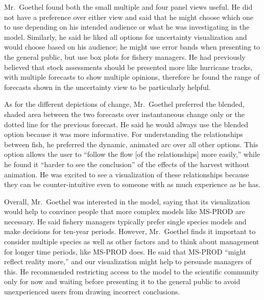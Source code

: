 Mr.\ Goethel found both the small multiple and four panel views useful.  He did not have a preference over either view and said that he might choose which one to use depending on his intended audience or what he was investigating in the model.  Similarly, he said he liked all options for uncertainty visualization and would choose based on his audience; he might use error bands when presenting to the general public, but use box plots for fishery managers.  He had previously believed that stock assessments should be presented more like hurricane tracks, with multiple forecasts to show multiple opinions, therefore he found the range of forecasts shown in the uncertainty view to be particularly helpful.

As for the different depictions of change, Mr.\ Goethel preferred the blended, shaded area between the two forecasts over instantaneous change only or the dotted line for the previous forecast.  He said he would always use the blended option because it was more informative.  For understanding the relationships between fish, he preferred the dynamic, animated arc over all other options.  This option allows the user to ``follow the flow [of the relationships] more easily,'' while he found it ``harder to see the conclusion'' of the effects of the harvest without animation.  He was excited to see a visualization of these relationships because they can be counter-intuitive even to someone with as much experience as he has.

Overall, Mr.\ Goethel was interested in the model, saying that its visualization would help to convince people that more complex models like MS-PROD are necessary.  He said fishery managers typically prefer single species models and make decisions for ten-year periods.  However, Mr.\ Goethel finds it important to consider multiple species as well as other factors and to think about management for longer time periods, like MS-PROD does.  He said that MS-PROD ``might reflect reality more,'' and our visualization might help to persuade managers of this.  He recommended restricting access to the model to the scientific community only for now and waiting before presenting it to the general public to avoid unexperienced users from drawing incorrect conclusions.
